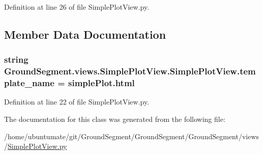 Definition at line 26 of file Simple\+Plot\+View.\+py.



\subsection{Member Data Documentation}
\hypertarget{class_ground_segment_1_1views_1_1_simple_plot_view_1_1_simple_plot_view_a92ddf99d5853e4f155c44a8e2dcc5401}{}
\subsubsection[{template\+\_\+name}]{\setlength{\rightskip}{0pt plus 5cm}string Ground\+Segment.\+views.\+Simple\+Plot\+View.\+Simple\+Plot\+View.\+template\+\_\+name = \textquotesingle{}simple\+Plot.\+html\textquotesingle{}\hspace{0.3cm}{\ttfamily [static]}}\label{class_ground_segment_1_1views_1_1_simple_plot_view_1_1_simple_plot_view_a92ddf99d5853e4f155c44a8e2dcc5401}


Definition at line 22 of file Simple\+Plot\+View.\+py.



The documentation for this class was generated from the following file\+:\begin{DoxyCompactItemize}
\item 
/home/ubuntumate/git/\+Ground\+Segment/\+Ground\+Segment/\+Ground\+Segment/views/\hyperlink{_simple_plot_view_8py}{Simple\+Plot\+View.\+py}\end{DoxyCompactItemize}
